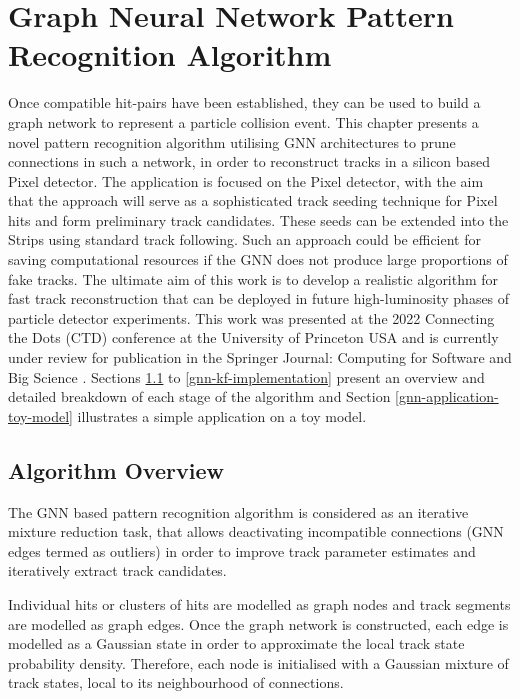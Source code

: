 
\chapter{Graph Neural Network Pattern Recognition Algorithm}\label{chapter-5}

Once compatible hit-pairs have been established, they can be used to build a graph network to represent a particle collision event. This chapter presents a novel pattern recognition algorithm utilising GNN architectures to prune connections in such a network, in order to reconstruct tracks in a silicon based Pixel detector. The application is focused on the Pixel detector, with the aim that the approach will serve as a sophisticated track seeding technique for Pixel hits and form preliminary track candidates. These seeds can be extended into the Strips using standard track following. Such an approach could be efficient for saving computational resources if the GNN does not produce large proportions of fake tracks. The ultimate aim of this work is to develop a realistic algorithm for fast track reconstruction that can be deployed in future high-luminosity phases of particle detector experiments. This work was presented at the 2022 Connecting the Dots (CTD) conference at the University of Princeton USA and is currently under review for publication in the Springer Journal: Computing for Software and Big Science \cite{Lad_2023_gnn}. Sections \ref{gnn-algorithm-overview} to \ref{gnn-kf-implementation} present an overview and detailed breakdown of each stage of the algorithm and Section \ref{gnn-application-toy-model} illustrates a simple application on a toy model.



\section{Algorithm Overview}
\label{gnn-algorithm-overview}
The GNN based pattern recognition algorithm is considered as an iterative mixture reduction task, that allows deactivating incompatible connections (GNN edges termed as outliers) in order to improve track parameter estimates and iteratively extract track candidates. 

Individual hits or clusters of hits are modelled as graph nodes and track segments are modelled as graph edges. Once the graph network is constructed, each edge is modelled as a Gaussian state in order to approximate the local track state probability density. Therefore, each node is initialised with a Gaussian mixture of track states, local to its neighbourhood of connections.

